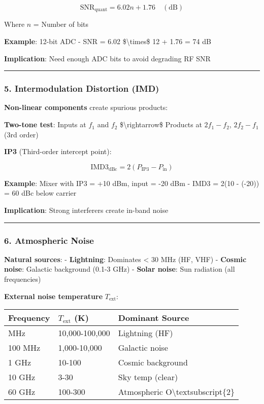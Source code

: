\[
\text{SNR}_{\text{quant}} = 6.02n + 1.76 \quad (\text{dB})
\]

Where \(n\) = Number of bits

\textbf{Example}: 12-bit ADC - SNR = 6.02 \$\textbackslash times\$ 12 +
1.76 = 74 dB

\textbf{Implication}: Need enough ADC bits to avoid degrading RF SNR

\begin{center}\rule{0.5\linewidth}{0.5pt}\end{center}

\subsubsection{5. Intermodulation Distortion
(IMD)}\label{intermodulation-distortion-imd}

\textbf{Non-linear components} create spurious products:

\textbf{Two-tone test}: Inputs at \(f_1\) and \(f_2\)
\$\textbackslash rightarrow\$ Products at \(2f_1 - f_2\), \(2f_2 - f_1\)
(3rd order)

\textbf{IP3} (Third-order intercept point):

\[
\text{IMD3}_{\text{dBc}} = 2(P_{\text{IP3}} - P_{\text{in}})
\]

\textbf{Example}: Mixer with IP3 = +10 dBm, input = -20 dBm - IMD3 =
2(10 - (-20)) = 60 dBc below carrier

\textbf{Implication}: Strong interferers create in-band noise

\begin{center}\rule{0.5\linewidth}{0.5pt}\end{center}

\subsubsection{6. Atmospheric Noise}\label{atmospheric-noise}

\textbf{Natural sources}: - \textbf{Lightning}: Dominates \textless{} 30
MHz (HF, VHF) - \textbf{Cosmic noise}: Galactic background (0.1-3 GHz) -
\textbf{Solar noise}: Sun radiation (all frequencies)

\textbf{External noise temperature} \(T_{\text{ext}}\):

{\def\LTcaptype{} %
\begin{longtable}[]{@{}lll@{}}
\toprule\noalign{}
Frequency & \(T_{\text{ext}}\) (K) & Dominant Source \\
\midrule\noalign{}
\endhead
\bottomrule\noalign{}
\endlastfoot
10 MHz & 10,000-100,000 & Lightning (HF) \\
100 MHz & 1,000-10,000 & Galactic noise \\
1 GHz & 10-100 & Cosmic background \\
10 GHz & 3-30 & Sky temp (clear) \\
60 GHz & 100-300 & Atmospheric O\textbackslash textsubscript\{2\} \\
\end{longtable}
}

